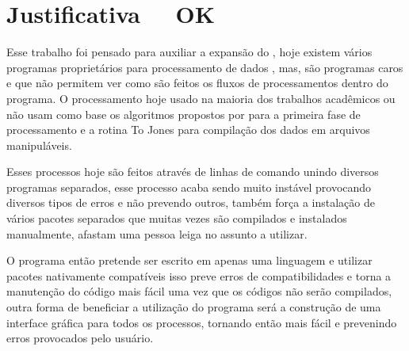 \chapter{Justificativa \,\,\,\,\, OK}
\label{cap-justificativa}

    Esse trabalho foi pensado para auxiliar a expansão do \MT, hoje existem vários programas proprietários para processamento de dados \MT, mas, são programas caros e que não permitem ver como são feitos os fluxos de processamentos dentro do programa. O processamento hoje usado na maioria dos trabalhos acadêmicos ou não usam como base os algoritmos propostos por \citeauthor{egbert97} para a primeira fase de processamento e a rotina To Jones \cite{egbert97} para compilação dos dados em arquivos manipuláveis.
    
    Esses processos hoje são feitos através de linhas de comando unindo diversos programas separados, esse processo acaba sendo muito instável provocando diversos tipos de erros e não prevendo outros, também força a instalação de vários pacotes separados que muitas vezes são compilados e instalados manualmente, afastam uma pessoa leiga no assunto a utilizar.
    
    O programa então pretende ser escrito em apenas uma linguagem e utilizar pacotes nativamente compatíveis isso preve erros de compatibilidades e torna a manutenção do código mais fácil uma vez que os códigos não serão compilados, outra forma de beneficiar a utilização do programa será a construção de uma interface gráfica para todos os processos, tornando então mais fácil e prevenindo erros provocados pelo usuário.    
    
    
